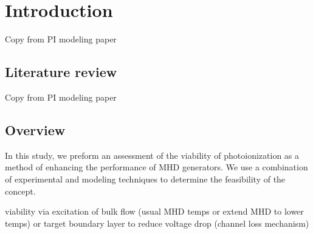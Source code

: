 

\section{Introduction}

Copy from PI modeling paper

\subsection{Literature review}

Copy from PI modeling paper

\subsection{Overview}

In this study, we preform an assessment of the viability of photoionization as a method of enhancing the performance of MHD generators. We use a combination of experimental and modeling techniques to determine the feasibility of the concept.


viability via excitation of bulk flow (usual MHD temps or extend MHD to lower temps) or target boundary layer to reduce voltage drop (channel loss mechanism) 


